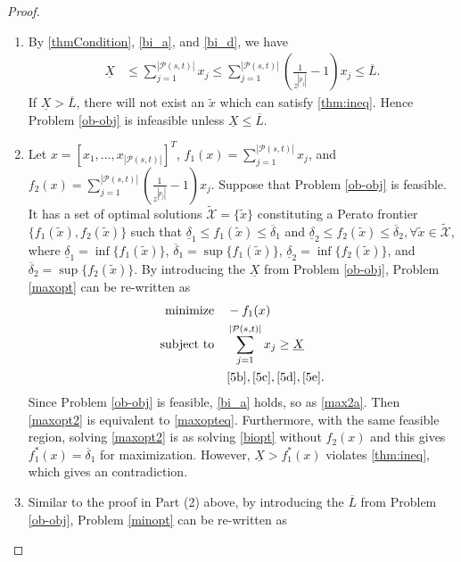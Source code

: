 \documentclass[journal]{IEEEtran}
\begin{document}
\begin{proof}
\begin{enumerate}
	\item By \eqref{thmCondition}, \eqref{bi_a}, and \eqref{bi_d}, we have
		\begin{align}
			\underline{X}	&	\leq \sum_{j=1}^{|\mathcal{P}(s,t)|}{x_j} 
							\leq \sum_{j=1}^{|\mathcal{P}(s,t)|}{(\frac{1}{z^{|p_j|}}-1)x_j}
							\leq \overline{L}. \label{thm:ineq}
		\end{align}
		If $\underline{X}>\overline{L}$, there will not exist an $\tilde{x}$ which can satisfy \eqref{thm:ineq}. Hence Problem \ref{ob-obj} is infeasible unless $\underline{X}\leq\overline{L}$.
		\item Let $x=[x_1,\ldots,x_{|\mathcal{P}(s,t)|}]^T$, $f_1(x)=\sum_{j=1}^{|\mathcal{P}(s,t)|}{x_j}$, and $f_2(x)=\sum_{j=1}^{|\mathcal{P}(s,t)|}{(\frac{1}{z^{|p_j|}}-1)x_j}$. Suppose that Problem \ref{ob-obj} is feasible.  It has a set of optimal solutions $\tilde{\mathcal{X}}=\{\tilde{x}\}$ constituting a Perato frontier $\{f_1(\tilde{x}),f_2(\tilde{x})\}$ such that $\underline{\delta}_1\leq f_1(\tilde{x})\leq \overline{\delta}_1$ and $\underline{\delta}_2\leq f_2(\tilde{x})\leq \overline{\delta}_2, \forall \tilde{x}\in\tilde{\mathcal{X}}$, where $\underline{\delta}_1=\inf\{f_1(\tilde{x})\}$, $\overline{\delta}_1=\sup\{f_1(\tilde{x})\}$, $\underline{\delta}_2=\inf\{f_2(\tilde{x})\}$, and $\overline{\delta}_2=\sup\{f_2(\tilde{x})\}$. By introducing the $\underline{X}$ from Problem \ref{ob-obj}, Problem \ref{maxopt} can be re-written as 
		\begin{subequations}
			\label{maxopt2}
			\begin{align}
			\text{minimize}\quad 	& -f_1(x) \\
			\text{subject to}\quad 
			& \sum_{j=1}^{|\mathcal{P}(s,t)|}{x_j} \geq \underline{X} \label{max2a}\\
			& \eqref{5b}, \eqref{5c}, \eqref{5d}, \eqref{5e}. 
			\end{align}
		\end{subequations}
		Since Problem \ref{ob-obj} is feasible, \eqref{bi_a} holds, so as \eqref{max2a}. Then \eqref{maxopt2} is equivalent to \eqref{maxopteq}. Furthermore, with the same feasible region, solving \eqref{maxopt2} is as solving \eqref{biopt} without $f_2(x)$ and this gives $f_1^*(x)=\overline{\delta}_1$ for maximization. However, $\underline{X}>f_1^*(x)$ violates \eqref{thm:ineq}, which gives an contradiction.
		\item Similar to the proof in Part (2) above, by introducing the $\overline{L}$ from Problem \ref{ob-obj}, Problem \ref{minopt} can be re-written as 

\end{enumerate}
\end{proof}
\end{document}
